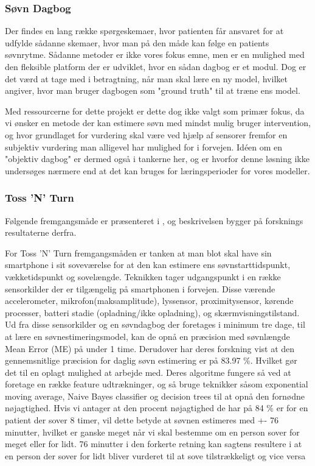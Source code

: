 \subsubsection{Søvn Dagbog}
Der findes en lang række spørgeskemaer, hvor patienten får ansvaret for at udfylde sådanne skemaer, hvor man på den måde kan følge en patients søvnrytme.
Sådanne metoder er ikke vores fokus emne, men er en mulighed med den fleksible platform der er udviklet, hvor en sådan dagbog er et modul.
Dog er det værd at tage med i betragtning, når man skal lære en ny model, hvilket \cite{Min:2014:TNT:2556288.2557220} angiver, hvor man bruger dagbogen som "ground truth" til at træne ens model.

Med ressourcerne for dette projekt er dette dog ikke valgt som primær fokus, da vi ønsker en metode der kan estimere søvn med mindst mulig bruger intervention, og hvor grundlaget for vurdering skal være ved hjælp af sensorer fremfor en subjektiv vurdering man alligevel har mulighed for i forvejen.
Idéen om en "objektiv dagbog" er dermed også i tankerne her, og er hvorfor denne løsning ikke undersøges nærmere end at det kan bruges for læringsperioder for vores modeller.

\subsubsection{Toss 'N' Turn}\label{sec:tossNturn}
Følgende fremgangsmåde er præsenteret i \citet{Min:2014:TNT:2556288.2557220}, og beskrivelsen bygger på forsknings resultaterne derfra.

For Toss 'N' Turn fremgangsmåden er tanken at man blot skal have sin smartphone i sit soveværelse for at den kan estimere ens søvnstarttidspunkt, vækketidspunkt og sovelængde.
Teknikken tager udgangspunkt i en række sensorkilder der er tilgængelig på smartphonen i forvejen.
Disse værende accelerometer, mikrofon(maksamplitude), lyssensor, proximitysensor, kørende processer, batteri stadie (opladning/ikke opladning), og skærmvisningstilstand.
Ud fra disse sensorkilder og en søvndagbog der foretages i minimum tre dage, til at lære en søvnestimeringsmodel, kan de opnå en præcision med søvnlængde Mean Error (ME) på under 1 time.
Derudover har deres forskning vist at den gennemsnitlige præcision for daglig søvn estimering er på 83.97 \%.
Hvilket gør det til en oplagt mulighed at arbejde med.
Deres algoritme fungere så ved at foretage en række feature udtrækninger, og så bruge teknikker såsom exponential moving average, Naive Bayes classifier og decision trees til at opnå den fornødne nøjagtighed.
Hvis vi antager at den procent nøjagtighed de har på 84 \% er for en patient der sover 8 timer, vil dette betyde at søvnen estimeres med +- 76 minutter, hvilket er ganske meget når vi skal bestemme om en person sover for meget eller for lidt.
76 minutter i den forkerte retning kan sagtens resultere i at en person der sover for lidt bliver vurderet til at sove tilstrækkeligt og vice versa


